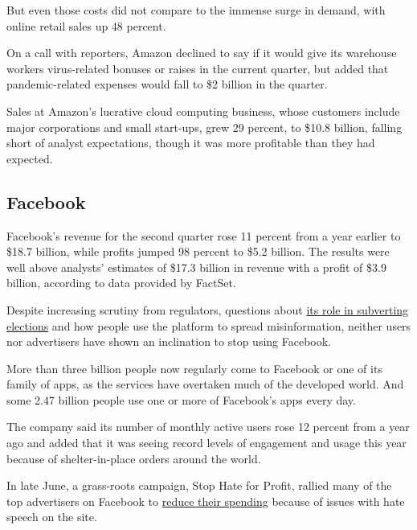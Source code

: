 But even those costs did not compare to the immense surge in demand,
with online retail sales up 48 percent.

On a call with reporters, Amazon declined to say if it would give its
warehouse workers virus-related bonuses or raises in the current
quarter, but added that pandemic-related expenses would fall to \$2
billion in the quarter.

Sales at Amazon's lucrative cloud computing business, whose customers
include major corporations and small start-ups, grew 29 percent, to
\$10.8 billion, falling short of analyst expectations, though it was
more profitable than they had expected.

\hypertarget{facebook}{%
\subsection{Facebook}\label{facebook}}

Facebook's revenue for the second quarter rose 11 percent from a year
earlier to \$18.7 billion, while profits jumped 98 percent to \$5.2
billion. The results were well above analysts' estimates of \$17.3
billion in revenue with a profit of \$3.9 billion, according to data
provided by FactSet.

Despite increasing scrutiny from regulators, questions about
\href{https://slack-redir.net/link?url=https\%3A\%2F\%2Fwww.nytimes3xbfgragh.onion\%2F2018\%2F02\%2F17\%2Ftechnology\%2Findictment-russian-tech-facebook.html}{its
role in subverting elections} and how people use the platform to spread
misinformation, neither users nor advertisers have shown an inclination
to stop using Facebook.

More than three billion people now regularly come to Facebook or one of
its family of apps, as the services have overtaken much of the developed
world. And some 2.47 billion people use one or more of Facebook's apps
every day.

The company said its number of monthly active users rose 12 percent from
a year ago and added that it was seeing record levels of engagement and
usage this year because of shelter-in-place orders around the world.

In late June, a grass-roots campaign, Stop Hate for Profit, rallied many
of the top advertisers on Facebook to
\href{https://slack-redir.net/link?url=https\%3A\%2F\%2Fwww.nytimes3xbfgragh.onion\%2F2020\%2F06\%2F30\%2Ftechnology\%2Ffacebook-advertising-boycott.html}{reduce
their spending} because of issues with hate speech on the site.


